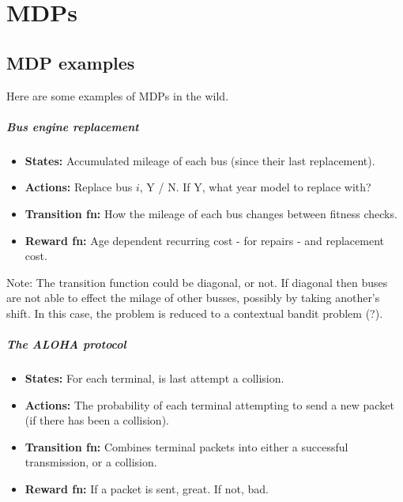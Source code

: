 \chapter{MDPs}

\section{MDP examples}\label{MDP-examples}

Here are some examples of MDPs in the wild.

\paragraph{Bus engine replacement}

\begin{itemize}
\tightlist
\item
  \textbf{States:} Accumulated mileage of each bus (since their last
  replacement).
\item
  \textbf{Actions:} Replace bus \(i\), Y / N. If Y, what year model to
  replace with?
\item
  \textbf{Transition fn:} How the mileage of each bus changes between
  fitness checks.
\item
  \textbf{Reward fn:} Age dependent recurring cost - for repairs - and
  replacement cost.
\end{itemize}

Note: The transition function could be diagonal, or not. If diagonal
then buses are not able to effect the milage of other busses, possibly
by taking another's shift. In this case, the problem is reduced to a
contextual bandit problem (?).

\cite{Putterman2015}

\hypertarget{the-aloha-protocol}{%
\paragraph{The ALOHA protocol}\label{the-aloha-protocol}}

\begin{itemize}
\tightlist
\item
  \textbf{States:} For each terminal, is last attempt a collision.
\item
  \textbf{Actions:} The probability of each terminal attempting to send
  a new packet (if there has been a collision).
\item
  \textbf{Transition fn:} Combines terminal packets into either a
  successful transmission, or a collision.
\item
  \textbf{Reward fn:} If a packet is sent, great. If not, bad.
\end{itemize}


